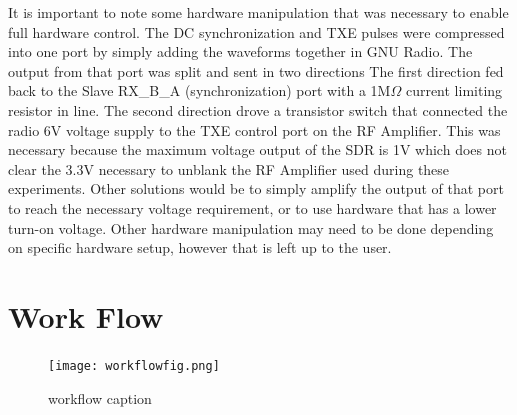 \documentclass[review]{elsarticle}
\renewcommand{\textcolor}[1]{}
\begin{document}
It is important to note some hardware manipulation that was necessary to enable full hardware control.  The DC synchronization and TXE pulses were compressed into one port by simply adding the waveforms together in GNU Radio.  The output from that port was split and sent in two directions\:  The first direction fed back to the Slave RX\_B\_A (synchronization) port with a 1M$\Omega$ current limiting resistor in line.  The second direction drove a transistor switch that connected the radio 6V voltage supply to the TXE control port on the RF Amplifier.  This was necessary because the maximum voltage output of the SDR is 1V which does not clear the 3.3V necessary to unblank the RF Amplifier used during these experiments.  Other solutions would be to simply amplify the output of that port to reach the necessary voltage requirement, or to use hardware that has a lower turn-on voltage.  Other hardware manipulation may need to be done depending on specific hardware setup, however that is left up to the user.


\section{Work Flow}\label{Work Flow}
\begin{figure}[!ht]
\begin{center}
\texttt{[image: workflowfig.png]}
\caption{\textcolor{black}{workflow caption}}
\label{fig:workflow}
\end{center}
\end{figure}
\end{document}
